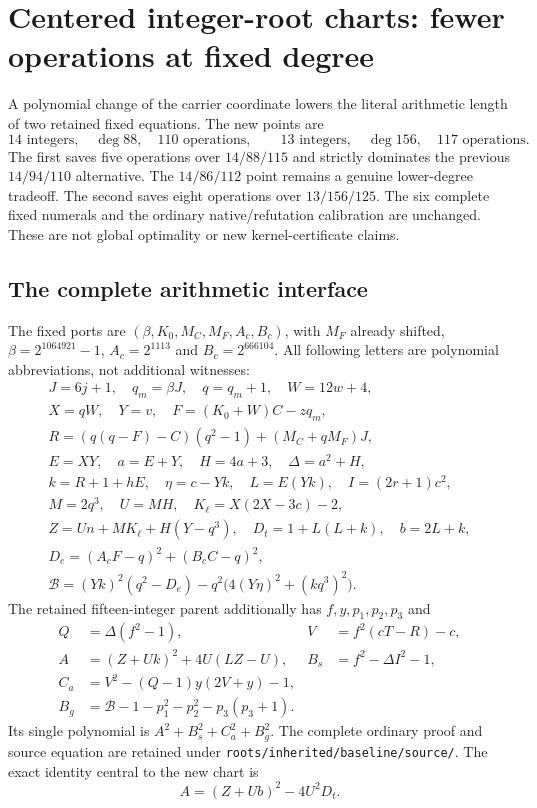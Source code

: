 \section{Centered integer-root charts: fewer operations at fixed degree}
\label{sec:centered-root-charts}

A polynomial change of the carrier coordinate lowers the literal arithmetic
length of two retained fixed equations. The new points are
\[
 \boxed{14\text{ integers},\quad\deg 88,\quad110\text{ operations}},
 \qquad
 \boxed{13\text{ integers},\quad\deg156,\quad117\text{ operations}}.
\]
The first saves five operations over $14/88/115$ and strictly dominates the
previous $14/94/110$ alternative. The $14/86/112$ point remains a genuine
lower-degree tradeoff. The second saves eight operations over $13/156/125$.
The six complete fixed numerals and the ordinary native/refutation calibration
are unchanged. These are not global optimality or new kernel-certificate claims.

\subsection{The complete arithmetic interface}
The fixed ports are $(\beta,K_0,M_C,M_F,A_c,B_c)$, with $M_F$ already shifted,
$\beta=2^{1064921}-1$, $A_c=2^{1113}$ and $B_c=2^{666104}$. All following
letters are polynomial abbreviations, not additional witnesses:
\begin{gather*}
 J=6j+1,\quad q_m=\beta J,\quad q=q_m+1,\quad W=12w+4,\\
 X=qW,\quad Y=v,\quad F=(K_0+W)C-zq_m,\\
 R=(q(q-F)-C)(q^2-1)+(M_C+qM_F)J,\\
 E=XY,\quad a=E+Y,\quad H=4a+3,\quad\Delta=a^2+H,\\
 k=R+1+hE,\quad\eta=c-Yk,\quad L=E(Yk),\quad I=(2r+1)c^2,\\
 M=2q^3,\quad U=MH,\quad K_\ell=X(2X-3c)-2,\\
 Z=Un+MK_\ell+H(Y-q^3),\quad D_t=1+L(L+k),\quad b=2L+k,\\
 D_e=(A_cF-q)^2+(B_cC-q)^2,\\
 \mathcal B=(Yk)^2(q^2-D_e)-q^2\bigl(4(Y\eta)^2+(kq^3)^2\bigr).
\end{gather*}
The retained fifteen-integer parent additionally has $f,y,p_1,p_2,p_3$ and
\begin{align*}
 Q&=\Delta(f^2-1),&V&=f^2(cT-R)-c,\\
 A&=(Z+Uk)^2+4U(LZ-U),&B_s&=f^2-\Delta I^2-1,\\
 C_a&=V^2-(Q-1)y(2V+y)-1,\\
 B_g&=\mathcal B-1-p_1^2-p_2^2-p_3(p_3+1).
\end{align*}
Its single polynomial is $A^2+B_s^2+C_a^2+B_g^2$. The complete ordinary
proof and source equation are retained under \texttt{roots/inherited/baseline/source/}.
The exact identity central to the new chart is
\begin{equation}\label{eq:center-carrier-identity}
 A=(Z+Ub)^2-4U^2D_t.
\end{equation}

